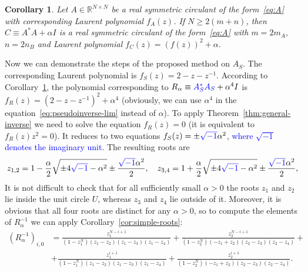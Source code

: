 \documentclass[a4paper]{article}
\newtheorem{corollary}{Corollary}[section]
\newcommand{\lap}{A_S}
\newcommand{\stiffnessQ}{R}
\begin{document}
	\begin{corollary}\label{cor:AstarA}
	Let $A \in \mathbb{R}^{N \times N}$ be a real symmetric circulant of the form~\eqref{eq:A} with corresponding Laurent polynomial $f_A(z)$.
	If $N \ge 2(m+n)$, then $C \equiv A^*A+\alpha I$ is a real symmetric circulant of the form~\eqref{eq:A} with $m = 2m_A$, $n = 2n_B$ and Laurent polynomial $f_C(z) = (f(z))^2 + \alpha$.
	\end{corollary}
	
	Now we can demonstrate the steps of the proposed method on $\lap$.
	The corresponding Laurent polynomial is $f_S(z) = 2 - z-z^{-1}$.
	According to Corollary~\ref{cor:AstarA}, the polynomial corresponding to $\stiffnessQ_{\alpha} \equiv \textcolor{blue}{A_S^*A_S} + \alpha^4 I$ is $f_\stiffnessQ(z) = (2-z-z^{-1})^2 + \alpha^4$
	(obviously, we can use $\alpha^4$ in the equation~\eqref{eq:pseudoinverse-lim} instead of $\alpha$).
	To apply Theorem~\ref{thm:general-inverse} we need to solve the equation $f_\stiffnessQ(z) = 0$ (it is equivalent to $f_\stiffnessQ(z)z^2 = 0$).
	It reduces to two equations $f_S(z) = \pm \textcolor{blue}{\sqrt{-1}}\alpha^2$, 	\textcolor{blue}{where $\sqrt{-1}$ denotes the imaginary unit.}
	The resulting roots are 
	\[
	z_{1,2} = 1 - \frac{\alpha}{2}\sqrt{\pm 4\textcolor{blue}{\sqrt{-1}} - \alpha^2} \pm \frac{\textcolor{blue}{\sqrt{-1}}\alpha^2}{2},~~~z_{3,4} = 1 + \frac{\alpha}{2}\sqrt{\pm 4\textcolor{blue}{\sqrt{-1}} -\alpha^2} \pm \frac{\textcolor{blue}{\sqrt{-1}}\alpha^2}{2},
	\]
	It is not difficult to check that for all sufficiently small $\alpha > 0$ the roots $z_1$ and $z_2$ lie inside the unit circle $U$, whereas $z_3$ and $z_4$ lie outside of it.
	Moreover, it is obvious that all four roots are distinct for any $\alpha > 0$, so to compute the elements of $\stiffnessQ_{\alpha}^{-1}$ we can apply Corollary~\ref{cor:simple-roots}:
	\begin{align*}
	(\stiffnessQ_\alpha^{-1})_{i,0} &= 
		\frac{z_{1}^{N - i + 1}}{\left(1 - z_{1}^{N}\right) \left(z_{1} - z_{2}\right) \left(z_{1} - z_{3}\right) \left(z_{1} - z_{4}\right)}
	+
	\frac{z_{2}^{N - i + 1}}{\left(1 - z_{2}^{N}\right) \left(- z_{1} + z_{2}\right) \left(z_{2} - z_{3}\right) \left(z_{2} - z_{4}\right)}
	+\\&+
	\frac{z_{1}^{i + 1}}{\left(1 - z_{1}^{N}\right) \left(z_{1} - z_{2}\right) \left(z_{1} - z_{3}\right) \left(z_{1} - z_{4}\right)}
	+
	\frac{z_{2}^{i + 1}}{\left(1 - z_{2}^{N}\right) \left(- z_{1} + z_{2}\right) \left(z_{2} - z_{3}\right) \left(z_{2} - z_{4}\right)}.
    \end{align*}
\end{document}
